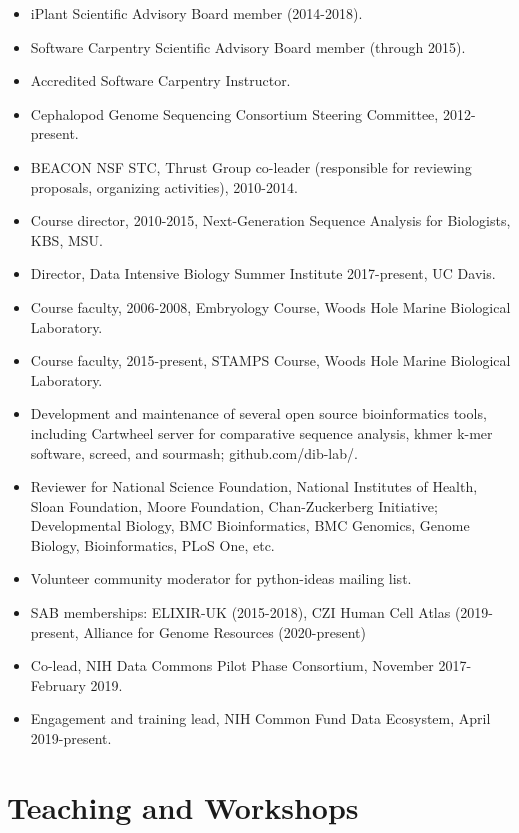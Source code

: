 \documentclass[margin,line]{resume}
\begin{document}
\begin{resume}
\begin{itemize}
\item iPlant Scientific Advisory Board member (2014-2018).
\item Software Carpentry Scientific Advisory Board member (through 2015).
\item Accredited Software Carpentry Instructor.
\item Cephalopod Genome Sequencing Consortium Steering Committee, 2012-present.
\item BEACON NSF STC, Thrust Group co-leader (responsible for reviewing
proposals, organizing activities), 2010-2014.
\item Course director, 2010-2015, Next-Generation Sequence Analysis for Biologists, KBS, MSU.
\item Director, Data Intensive Biology Summer Institute 2017-present, UC Davis.
\item Course faculty, 2006-2008, Embryology Course, Woods Hole Marine Biological Laboratory.
\item Course faculty, 2015-present, STAMPS Course, Woods Hole Marine Biological Laboratory.
\item Development and maintenance of several open source bioinformatics tools, including
Cartwheel server for comparative sequence analysis, khmer k-mer software,
screed, and sourmash; github.com/dib-lab/.
\item Reviewer for National Science Foundation, National Institutes of Health, Sloan Foundation, Moore Foundation, Chan-Zuckerberg Initiative; Developmental Biology, BMC Bioinformatics, BMC Genomics, Genome Biology, Bioinformatics, PLoS One, etc.
\item Volunteer community moderator for python-ideas mailing list.
\item SAB memberships: ELIXIR-UK (2015-2018), CZI Human Cell Atlas (2019-present, Alliance for Genome Resources (2020-present)
\item Co-lead, NIH Data Commons Pilot Phase Consortium, November 2017-February 2019.
\item Engagement and training lead, NIH Common Fund Data Ecosystem, April 2019-present.
\end{itemize}

\section{\mysidestyle Teaching and Workshops}

\begin{itemize}


\end{itemize}
\end{resume}
\end{document}

